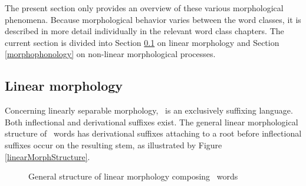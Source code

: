 The present section only provides an overview of these various morphological phenomena. 
Because morphological behavior varies between the word classes, it is described in more detail individually in the relevant word class chapters. The current section is divided into Section \ref{linearMorphology} on linear morphology and Section \ref{morphophonology} on non-linear morphological processes. %



\subsection{Linear morphology}\label{linearMorphology}
Concerning linearly separable morphology, \PS\ is an exclusively suffixing language. Both inflectional and derivational suffixes exist. %
The general linear morphological structure of \PS\ words has derivational suffixes attaching to a root before inflectional suffixes occur on the resulting stem, as illustrated by Figure \vref{linearMorphStructure}.
\begin{figure}
\caption{General structure of linear morphology composing \PS\ words}\label{linearMorphStructure}
\end{figure}

%


